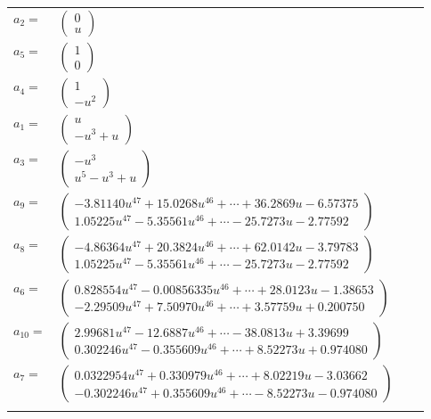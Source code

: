 \documentclass[1p]{elsarticle_modified}
\theoremstyle{definition}
\begin{document}
\begin{tabular}{m{7pt} m{180pt} m{7pt} m{180pt} }
\flushright $a_{2}=$&$\begin{pmatrix}0\\u\end{pmatrix}$ \\
\flushright $a_{5}=$&$\begin{pmatrix}1\\0\end{pmatrix}$ \\
\flushright $a_{4}=$&$\begin{pmatrix}1\\- u^2\end{pmatrix}$ \\
\flushright $a_{1}=$&$\begin{pmatrix}u\\- u^3+u\end{pmatrix}$ \\
\flushright $a_{3}=$&$\begin{pmatrix}- u^3\\u^5- u^3+u\end{pmatrix}$ \\
\flushright $a_{9}=$&$\begin{pmatrix}-3.81140 u^{47}+15.0268 u^{46}+\cdots+36.2869 u-6.57375\\1.05225 u^{47}-5.35561 u^{46}+\cdots-25.7273 u-2.77592\end{pmatrix}$ \\
\flushright $a_{8}=$&$\begin{pmatrix}-4.86364 u^{47}+20.3824 u^{46}+\cdots+62.0142 u-3.79783\\1.05225 u^{47}-5.35561 u^{46}+\cdots-25.7273 u-2.77592\end{pmatrix}$ \\
\flushright $a_{6}=$&$\begin{pmatrix}0.828554 u^{47}-0.00856335 u^{46}+\cdots+28.0123 u-1.38653\\-2.29509 u^{47}+7.50970 u^{46}+\cdots+3.57759 u+0.200750\end{pmatrix}$ \\
\flushright $a_{10}=$&$\begin{pmatrix}2.99681 u^{47}-12.6887 u^{46}+\cdots-38.0813 u+3.39699\\0.302246 u^{47}-0.355609 u^{46}+\cdots+8.52273 u+0.974080\end{pmatrix}$ \\
\flushright $a_{7}=$&$\begin{pmatrix}0.0322954 u^{47}+0.330979 u^{46}+\cdots+8.02219 u-3.03662\\-0.302246 u^{47}+0.355609 u^{46}+\cdots-8.52273 u-0.974080\end{pmatrix}$\\&\end{tabular}
\end{document}
